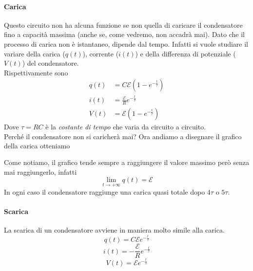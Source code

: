 \paragraph{Carica}
Questo circuito non ha alcuna funzione se non quella di caricare il condensatore fino a capacità 
massima (anche se, come vedremo, non accadrà mai). Dato che il processo di carica non è istantaneo,
dipende dal tempo. Infatti si vuole studiare il variare della carica ($q(t)$), corrente ($i(t)$) e
della differenza di potenziale ($V(t)$) del condensatore.\\
Rispettivamente sono
\begin{align*}
q(t)&=C\mathcal{E}\left(1-e^{-\frac{t}{\tau}}\right)\\
i(t)&=\frac{\mathcal{E}}{R}e^{-\frac{t}{\tau}}\\
V(t)&=\mathcal{E}\left(1-e^{-\frac{t}{\tau}}\right)
\end{align*}
Dove $\tau=RC$ è la \emph{costante di tempo} che varia da circuito a circuito.\\ [\baselineskip]
Perché il condensatore non si caricherà mai? Ora andiamo
a disegnare il grafico della carica otteniamo
\begin{center}
\end{center}
Come notiamo, il grafico tende sempre a raggiungere il valore massimo però senza mai raggiungerlo,
infatti
\begin{equation*}
\lim\limits_{t\to+\infty}q(t) = \mathcal{E}
\end{equation*}
In ogni caso il condensatore raggiunge una carica quasi totale dopo $4\tau$ o $5\tau$.

\paragraph{Scarica}
La scarica di un condensatore avviene in maniera molto simile alla carica.
\begin{equation*}
  q(t) = C\mathcal{E}e^{-\frac{t}{\tau}}
\end{equation*}
\begin{equation*}
  i(t) = -\frac{\mathcal{E}}{R}e^{-\frac{t}{\tau}}
\end{equation*}
\begin{equation*}
  V(t) = \mathcal{E}e^{-\frac{t}{\tau}}
\end{equation*}

